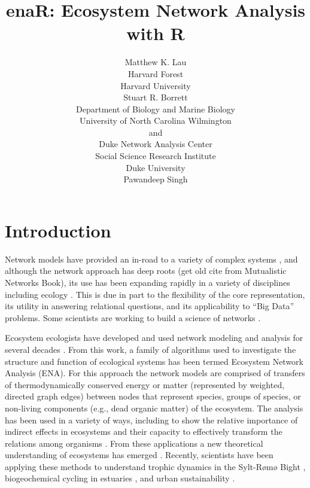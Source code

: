 \documentclass[article]{jss}
\author{Matthew K. Lau\\Harvard Forest\\Harvard University\\ \And
        Stuart R. Borrett\\Department of Biology and Marine Biology\\
        University of North Carolina Wilmington\\and\\Duke Network
        Analysis Center\\Social Science Research Institute\\Duke
        University\\ \And Pawandeep Singh}
\title{enaR: Ecosystem Network Analysis with R}
\begin{document}


\section[Introduction]{Introduction}
Network models have provided an in-road to a variety of complex systems \cite{watts1998collective, newman01scientific1, barabasi12, newman06structure, wasserman1994}, and
although the network approach has deep roots (get old cite from
Mutualistic Networks Book), its use has been expanding rapidly in a
variety of disciplines including ecology \citep{borrett14_rise, ings2009}.  This is due in
part to the flexibility of the core representation, its utility in
answering relational questions, and its applicability to ``Big Data''
problems.  Some scientists are working to build a science of networks \citep{nrc06network, brandes13}.


Ecosystem ecologists have developed and used network modeling and analysis for several decades \citep{borrett12_netecol,ulanowicz86,fath99_review}.  From this work, a family of algorithms used to investigate the structure and function of ecological systems has been termed Ecosystem Network Analysis (ENA).  For this approach the network models are comprised of
transfers of thermodynamically conserved energy or matter (represented by weighted, directed graph edges)
between nodes that represent species, groups of species, or non-living components (e.g.,
dead organic matter) of the ecosystem.  The analysis
has been used in a variety of ways, including to show the relative
importance of indirect effects in ecosystems \citep{patten83,
  higashi89, salas11_did} and their capacity to effectively transform
the relations among organisms \citep{ulanowicz90, patten91, fath98,
  bondavalli99}.  From these applications a new theoretical
understanding of ecosystems has emerged \citep{higashi91, belgrano05,
  jorgensen07_newecology}.  Recently, scientists have been applying
these methods to understand trophic dynamics in the Sylt-R{\o}m{\o}
Bight \citep{baird04_sylt,baird08_sylt}, biogeochemical cycling in
estuaries \citep{christian03, hines12}, and urban sustainability
\citep{zhang10, chen12}.
\end{document}
